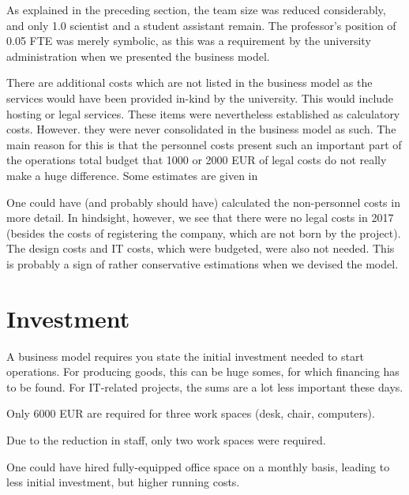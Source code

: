 \documentclass[output=guidelines,nonflat,smallfont,
draftmode
]{langsci/langscibook}
\newcommand{\background}[1]{ 
  \vspace{5mm}
  \renewcommand{\tblslinecolour}{lsDarkBlue}
  \tblssy[red]{explore2}{Background}{\vspace*{-5mm}#1}
}
\newcommand{\langscisolution}[1]{
  \renewcommand{\tblslinecolour}{lsLightBlue}
  \tblssy{langsci}{LangSci solution}{\vspace*{-5mm}#1}
}
\newcommand{\evaluation}[1]{
  \renewcommand{\tblslinecolour}{lsLightOrange}
  \tblssy{receipt}{Evaluation}{\vspace*{-5mm}#1}
}
\newcommand{\othersolutions}[1]{
  \renewcommand{\tblslinecolour}{lsDarkGreenOne}
  \tblssy{more}{Other solutions}{\vspace*{-5mm}#1}
}
\renewcommand{\tblssy}[4][black!12]{%
  \renewcommand{\langscisymbol}{#2}\renewcommand{\tblsboxcolor}{#1}
  \begin{mdframed}[style=yellowexercise,frametitle={#3}]
    #4
  \end{mdframed}
}
\begin{document}
\evaluation{As explained in the preceding section, the team size was reduced considerably, and only 1.0 scientist and a student assistant remain. The professor's position of 0.05 FTE was merely symbolic, as this was a requirement by the university administration when we presented the business model. 

There are additional costs which are not listed in the business model as the services would have been provided in-kind by the university. This would include hosting or legal services. These items were nevertheless established as calculatory costs.\todo[inline]{add figures} However. they were never consolidated in the business model as such. The main reason for this is that the personnel costs present such an important part of the operations total budget that 1000 or 2000 EUR of legal costs do not really make a huge difference. Some estimates are given in \todo[inline]{the appendix}
}
\othersolutions{
One could have (and probably should have) calculated the non-personnel costs in more detail.  In hindsight, however, we see that there were no legal costs in 2017 (besides the costs of registering the company, which are not born by the project). The design costs and IT costs, which were budgeted, were also not needed.  This is probably a sign of rather conservative estimations when we devised the model. 
}
  

\section{Investment}

\background{A business model requires you state the initial investment needed to start operations. For producing goods, this can be huge somes, for which financing has to be found. For IT-related projects, the sums are a lot less important these days.}
\langscisolution{
Only 6000 EUR are required for three work spaces (desk, chair, computers). 
}
\evaluation{Due to the reduction in staff, only two work spaces were required.}
\othersolutions{
One could have hired fully-equipped office space on a monthly basis, leading to less initial investment, but higher running costs. 
}
 

% 
%  
% 
% 
%  
\end{document}
